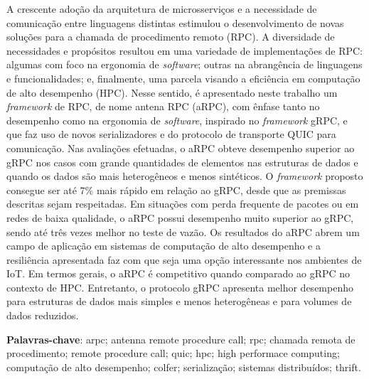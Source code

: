 \begin{resumo}
\begin{SingleSpace}
A crescente adoção da arquitetura de microsserviços e a necessidade de comunicação entre linguagens distintas estimulou o desenvolvimento de novas soluções para a chamada de procedimento remoto (RPC). A diversidade de necessidades e propósitos resultou em uma variedade de implementações de RPC: algumas com foco na ergonomia de \emph{software}; outras na abrangência de linguagens e funcionalidades; e, finalmente, uma parcela visando a eficiência em computação de alto desempenho (HPC). Nesse sentido, é apresentado neste trabalho um \emph{framework} de RPC, de nome antena RPC (aRPC), com ênfase tanto no desempenho como na ergonomia de \emph{software}, inspirado no \emph{framework} gRPC, e que faz uso de novos serializadores e do protocolo de transporte QUIC para comunicação. 
Nas avaliações efetuadas, o aRPC obteve desempenho superior ao gRPC nos casos com grande quantidades de elementos nas estruturas de dados e quando os dados são mais heterogêneos e menos sintéticos. O \textit{framework} proposto consegue ser até 7\% mais rápido em relação ao gRPC, desde que as premissas descritas sejam respeitadas. Em situações com perda frequente de pacotes ou em redes de baixa qualidade, o aRPC possui desempenho muito superior ao gRPC, sendo até três vezes melhor no teste de vazão. Os resultados do aRPC abrem um campo de aplicação em sistemas de computação de alto desempenho e a resiliência apresentada faz com que seja uma opção interessante nos ambientes de IoT. Em termos gerais, o aRPC é competitivo quando comparado ao gRPC no contexto de HPC. Entretanto, o protocolo gRPC apresenta melhor desempenho para estruturas de dados mais simples e menos heterogêneas e para volumes de dados reduzidos. 


\end{SingleSpace}
\vspace{\onelineskip}
\textbf{Palavras-chave}: arpc; antenna remote procedure call; rpc; chamada remota de procedimento; remote procedure call; quic; hpc; high performace computing; computação de alto desempenho; colfer; serialização; sistemas distribuídos; thrift.

\end{resumo}

